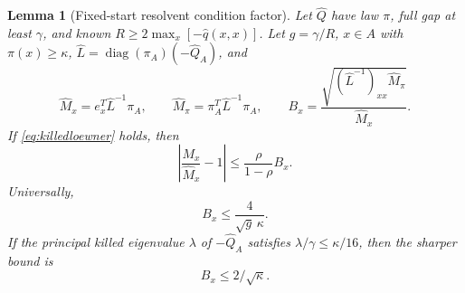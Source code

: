 \documentclass[10pt,a4paper]{article}
\newtheorem{lemma}[theorem]{Lemma}
\theoremstyle{definition}\newtheorem{assumption}[theorem]{Assumption}
\newcommand{\diag}{\operatorname{diag}}
\begin{document}
\begin{lemma}[Fixed-start resolvent condition factor]
\label{lem:fixed}
Let $\widehat Q$ have law $\pi$, full gap at least $\gamma$, and known $R\ge2\max_x[-\widehat q(x,x)]$. Let $g=\gamma/R$, $x\in A$ with $\pi(x)\ge\kappa$, $\widehat L=\diag(\pi_A)(-\widehat Q_A)$, and
\[
 \widehat M_x=e_x^T\widehat L^{-1}\pi_A,\qquad
 \widehat M_\pi=\pi_A^T\widehat L^{-1}\pi_A,\qquad
 B_x=\frac{\sqrt{(\widehat L^{-1})_{xx}\widehat M_\pi}}{\widehat M_x}.
\]
If \eqref{eq:killedloewner} holds, then
\begin{equation}
 \left|\frac{M_x}{\widehat M_x}-1\right|
 \le \frac{\rho}{1-\rho}B_x.
 \label{eq:fixedrelative}
\end{equation}
Universally,
\begin{equation}
 B_x\le\frac{4}{\sqrt g\,\kappa}.
 \label{eq:globalB}
\end{equation}
If the principal killed eigenvalue $\lambda$ of $-\widehat Q_A$ satisfies $\lambda/\gamma\le\kappa/16$, then the sharper bound is
\begin{equation}
 B_x\le 2/\sqrt\kappa.
 \label{eq:rareB}
\end{equation}
\end{lemma}
\end{document}
